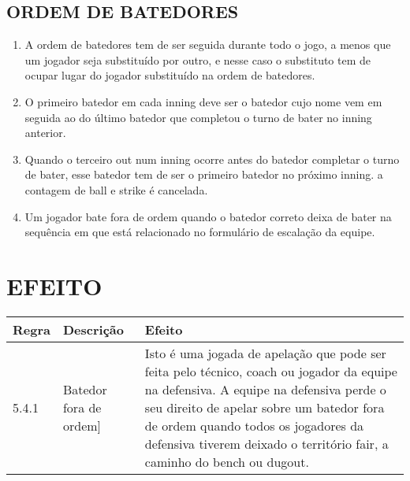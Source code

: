 \subsection{ORDEM DE BATEDORES}

\begin{enumerate}[label=(\alph*)]
	\item   A ordem de batedores tem de ser seguida durante todo o jogo, a menos que um jogador seja substituído por outro, e nesse caso o substituto tem de ocupar lugar do jogador substituído na ordem de batedores.
	\item  O primeiro batedor em cada \gls{inning} deve ser o batedor cujo nome vem em seguida ao do último batedor que completou o turno de bater no \gls{inning} anterior.
	\item  Quando o terceiro \gls{out} num \gls{inning} ocorre antes do batedor completar o turno de bater, esse batedor tem de ser o primeiro batedor no próximo \gls{inning}. a contagem de \gls{ball} e \gls{strike} é cancelada.
	\item  Um jogador bate fora de ordem quando o batedor correto deixa de bater na sequência em que está relacionado no formulário de escalação da equipe.
\end{enumerate}

\section*{EFEITO}

{\footnotesize\begin{tabular}{p{15mm}p{60mm}p{90mm}}
		Regra& Descrição & Efeito\\\hline
		5.4.1 & Batedor fora de ordem] & Isto é uma jogada de apelação que pode ser feita pelo técnico, \gls{coach} ou jogador da equipe na defensiva. A equipe na defensiva perde o seu direito de apelar sobre um batedor fora de ordem quando todos os jogadores da defensiva tiverem deixado o território \gls{fair}, a caminho do \gls{bench} ou \gls{dugout}.
\end{tabular}}


